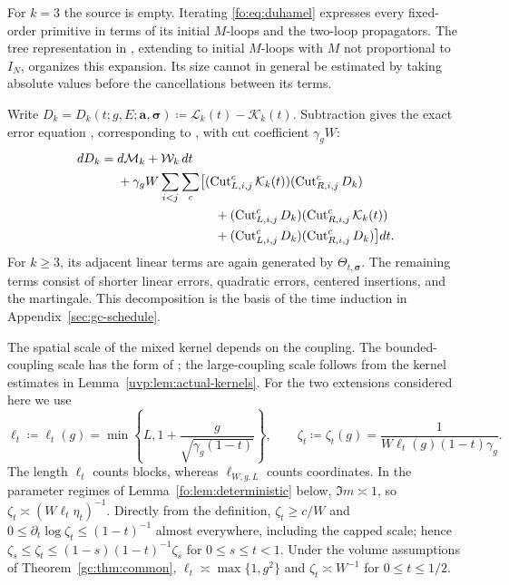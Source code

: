 \documentclass[11pt]{article}
\numberwithin{equation}{section}
\theoremstyle{remark}
\newcommand{\ellstar}{\ell_{W,g,L}}
\newcommand{\cL}{\mathcal L}
\newcommand{\cK}{\mathcal K}
\begin{document}
For \(k=3\) the source is empty. Iterating
\eqref{fo:eq:duhamel} expresses every fixed-order primitive in terms
of its initial \(M\)-loops and the two-loop propagators. The tree
representation in \cite[Lemma~4.16]{TYY}, extending
\cite[Lemma~3.4]{YY} to initial $M$-loops with $M$ not proportional to $I_N$, organizes this expansion.
Its size cannot in general be estimated by taking absolute values
before the cancellations between its terms.

Write $D_k=D_k(t;g,E;\boldsymbol a,\boldsymbol\sigma)
\coloneqq\cL_k(t)-\cK_k(t)$. Subtraction gives the exact error
equation \cite[(7.14)--(7.15)]{TYY}, corresponding to
\cite[(5.12)--(5.13)]{YY}, with cut coefficient $\gamma_g W$:
\begin{equation}\label{fo:eq:error-hierarchy}
\begin{split}
 dD_k={}&d\mathcal M_k+\mathcal W_k\,dt\\
 &+\gamma_g W\sum_{i<j}\sum_c\bigl[
   (\operatorname{Cut}_{L,i,j}^c\cK_k(t))
       (\operatorname{Cut}_{R,i,j}^cD_k)\\
 &\hspace{27mm}+(\operatorname{Cut}_{L,i,j}^cD_k)
       (\operatorname{Cut}_{R,i,j}^c\cK_k(t))\\
 &\hspace{27mm}+(\operatorname{Cut}_{L,i,j}^cD_k)
       (\operatorname{Cut}_{R,i,j}^cD_k)\bigr]dt.
 \end{split}
\end{equation}
For \(k\ge3\), its adjacent linear terms are again generated by
\(\Theta_{t,\boldsymbol\sigma}\).
The remaining terms consist of shorter linear errors, quadratic
errors, centered insertions, and the martingale. This decomposition
is the basis of the time induction in Appendix~\ref{sec:gc-schedule}.

The spatial scale of the mixed kernel depends on the coupling.
The bounded-coupling scale has the form of \cite[(3.42)]{TYY};
the large-coupling scale follows from the kernel estimates in
Lemma~\ref{uvp:lem:actual-kernels}. For the two extensions considered here we use
\begin{equation}\label{fo:eq:scale}
 \ell_t\coloneqq\ell_t(g)
 =\min\left\{L,1+\frac{g}{\sqrt{\gamma_g(1-t)}}\right\},\qquad
 \zeta_t\coloneqq\zeta_t(g)=\frac1{ W\ell_t(g)(1-t)\gamma_g}.
\end{equation}
The length \(\ell_t\) counts blocks, whereas \(\ellstar\) counts
coordinates. In the parameter regimes of Lemma~\ref{fo:lem:deterministic}
below, \(\Im m\asymp1\), so
\(\zeta_t\asymp(W\ell_t\eta_t)^{-1}\).
Directly from the definition, $\zeta_t\ge c/W$ and
$0\le\partial_t\log\zeta_t\le(1-t)^{-1}$ almost everywhere,
including the capped scale; hence
$\zeta_s\le\zeta_t\le(1-s)(1-t)^{-1}\zeta_s$ for $0\le s\le t<1$.
Under the volume assumptions of Theorem~\ref{gc:thm:common},
$\ell_t\asymp\max\{1,g^2\}$ and $\zeta_t\asymp W^{-1}$ for $0\le t\le1/2$.
\end{document}
